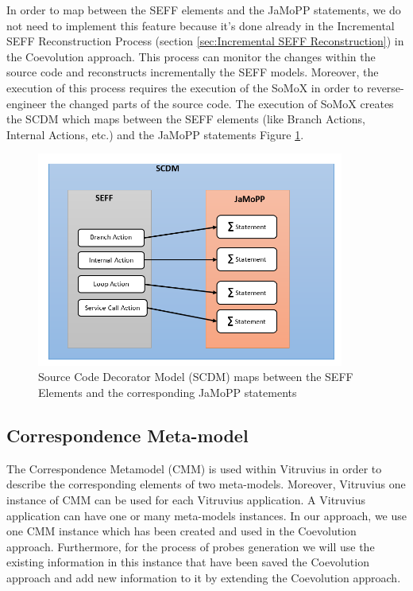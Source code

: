 In order to map between the SEFF elements and the JaMoPP statements, we do not need to implement this feature because it's done already in the Incremental SEFF Reconstruction Process (section \ref{sec:Incremental SEFF Reconstruction}) in the Coevolution approach. This process can monitor the changes within the source code and reconstructs incrementally the SEFF models. Moreover, the execution of this process requires the execution of the SoMoX in order to reverse-engineer the changed parts of the source code. The execution of SoMoX creates the SCDM which maps between the SEFF elements (like Branch Actions, Internal Actions, etc.) and the JaMoPP statements Figure \ref{fig:seff jamopp}.


\begin{figure}[h]
\centering
\includegraphics[width=0.9\textwidth]{figures/seff_jamopp}
\caption{Source Code Decorator Model (SCDM) maps between the SEFF Elements and the corresponding JaMoPP statements}
\label{fig:seff jamopp}
\end{figure}



\subsection{Correspondence Meta-model}
\label{sec:Correspondence Meta-model}
The Correspondence Metamodel (CMM) is used within Vitruvius in order to describe the corresponding elements of two meta-models. Moreover, Vitruvius one instance of CMM can be used for each Vitruvius application. A Vitruvius application can have one or many meta-models instances.  In our approach, we use one CMM instance which has been created and used in the Coevolution approach. Furthermore, for the process of probes generation we will use the existing information in this instance that have been saved the Coevolution approach and add new information to it by extending the Coevolution approach.

